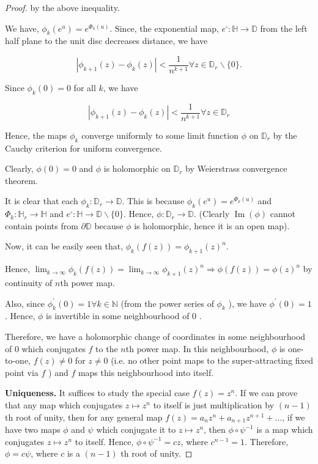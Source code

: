 \begin{proof}
by the above inequality.

We have, $\phi_{k}\left(e^{u}\right)=e^{\Phi_{k}(u)}$. Since, the exponential map, $e^{\square}: \mathbb{H} \rightarrow \mathbb{D}$ from the left half plane to the unit disc decreases distance, we have

$$
\left|\phi_{k+1}(z)-\phi_{k}(z)\right|<\frac{1}{n^{k+1}} \forall z \in \mathbb{D}_{r} \backslash\{0\} .
$$

Since $\phi_{k}(0)=0$ for all $k$, we have

$$
\left|\phi_{k+1}(z)-\phi_{k}(z)\right|<\frac{1}{n^{k+1}} \forall z \in \mathbb{D}_{r}
$$

Hence, the maps $\phi_{k}$ converge uniformly to some limit function $\phi$ on $\mathbb{D}_{r}$ by the Cauchy criterion for uniform convergence.

Clearly, $\phi(0)=0$ and $\phi$ is holomorphic on $\mathbb{D}_{r}$ by Weierstrass convergence theorem.

It is clear that each $\phi_{k}: \mathbb{D}_{r} \rightarrow \mathbb{D}$. This is because $\phi_{k}\left(e^{u}\right)=e^{\Phi_{k}(u)}$ and $\Phi_{k}: \mathbb{H}_{r} \rightarrow \mathbb{H}$ and $e^{\square}: \mathbb{H} \rightarrow \mathbb{D} \backslash\{0\}$. Hence, $\phi: \mathbb{D}_{r} \rightarrow \mathbb{D}$. (Clearly $\operatorname{Im}(\phi)$ cannot contain points from $\partial \mathbb{D}$ because $\phi$ is holomorphic, hence it is an open map).

Now, it can be easily seen that, $\phi_{k}(f(z))=\phi_{k+1}(z)^{n}$.

Hence, $\lim _{k \rightarrow \infty} \phi_{k}(f(z))=\lim _{k \rightarrow \infty} \phi_{k+1}(z)^{n} \Longrightarrow \phi(f(z))=\phi(z)^{n}$ by continuity of $n$th power map.

Also, since $\phi_{k}^{\prime}(0)=1 \forall k \in \mathbb{N}$ (from the power series of $\phi_{k}$ ), we have $\phi^{\prime}(0)=1$. Hence, $\phi$ is invertible in some neighbourhood of 0 .

Therefore, we have a holomorphic change of coordinates in some neighbourhood of 0 which conjugates $f$ to the $n$th power map. In this neighbourhood, $\phi$ is one-to-one, $f(z) \neq 0$ for $z \neq 0$ (i.e. no other point maps to the super-attracting fixed point via $f$ ) and $f$ maps this neighbourhood into itself.\\
\vspace{1pt}

\noindent \textbf{Uniqueness.} It suffices to study the special case $f(z)=z^{n}$. If we can prove that any map which conjugates $z \mapsto z^{n}$ to itself is just multiplication by $(n-1)$ th root of unity, then for any general map $f(z)=a_{n} z^{n}+a_{n+1} z^{n+1}+\ldots$, if we have two maps $\phi$ and $\psi$ which conjugate it to $z \mapsto z^{n}$, then $\phi \circ \psi^{-1}$ is a map which conjugates $z \mapsto z^{n}$ to itself. Hence, $\phi \circ \psi^{-1}=c z$, where $c^{n-1}=1$. Therefore, $\phi=c \psi$, where $c$ is a $(n-1)$ th root of unity.


\end{proof}
